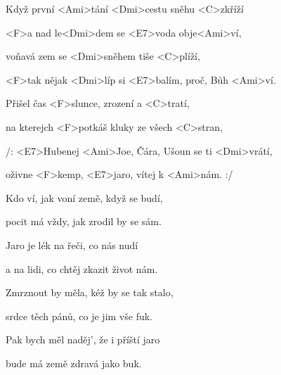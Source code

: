 

\zs
Když první <Ami>tání <Dmi>cestu sněhu <C>zkříží

<F>a nad le<Dmi>dem se <E7>voda obje<Ami>ví,

voňavá zem se <Dmi>sněhem tiše <C>plíží,

<F>tak nějak <Dmi>líp si <E7>balím, proč, Bůh <Ami>ví.
\ks



\zr
Přišel čas <F>slunce, {zroz}ení a <C>tratí,

na kterejch <F>potkáš {klu}ky ze všech <C>stran,

/: <E7>Hubenej <Ami>Joe, Čára, Ušoun se ti <Dmi>vrátí,

oživne <F>kemp, <E7>jaro, vítej k <Ami>nám. :/
\kr

\zs
Kdo ví, jak voní země, když se budí,

pocit má vždy, jak zrodil by se sám.

Jaro je lék na řeči, co nás nudí

a na lidi, co chtěj zkazit život nám.
\ks


\zr \kr


\zs
Zmrznout by měla, kéž by se tak stalo,

srdce těch pánů, co je jim vše fuk.

Pak bych měl naděj', že i příští jaro

bude má země zdravá jako buk.
\ks

\zr \kr

\kp






